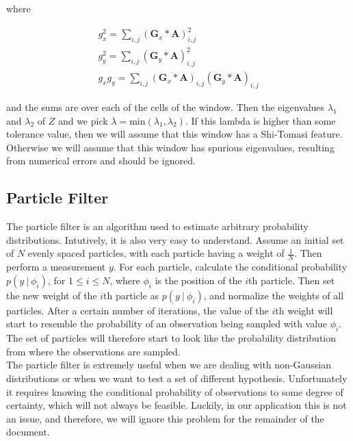 \documentclass{article}
\begin{document}
where

\begin{gather*}
g_x^2 = \sum_{i, j} (\mathbf{G}_x * \mathbf{A})_{i, j}^2 \\
g_y^2 = \sum_{i, j} (\mathbf{G}_y * \mathbf{A})_{i, j}^2 \\
g_x g_y = \sum_{i, j} (\mathbf{G}_x * \mathbf{A})_{i, j} (\mathbf{G}_y * \mathbf{A})_{i, j}
\end{gather*}

and the sums are over each of the cells of the window. Then the eigenvalues $\lambda_1$ and $\lambda_2$ of $Z$ and we pick $\lambda = \text{min} (\lambda_1, \lambda_2)$. If this lambda is higher than some tolerance value, then we will assume that this window has a Shi-Tomasi feature. Otherwise we will assume that this window has spurious eigenvalues, resulting from numerical errors and should be ignored. \\

\subsection{Particle Filter}

The particle filter \cite{Arulampalam2002} is an algorithm used to estimate arbitrary probability distributions. Intutively, it is also very easy to understand. Assume an initial set of $N$ evenly spaced particles, with each particle having a weight of $\frac{1}{N}$. Then perform a measurement $y$. For each particle, calculate the conditional probability $p(y \: | \: \phi_i)$, for $1 \leq i \leq N$, where $\phi_i$ is the position of the $i$th particle. Then set the new weight of the $i$th particle as $p(y \: | \: \phi_i)$, and normalize the weights of all particles. After a certain number of iterations, the value of the $i$th weight will start to resemble the probability of an observation being sampled with value $\phi_i$. The set of particles will therefore start to look like the probability distribution from where the observations are sampled. \\

The particle filter is extremely useful when we are dealing with non-Gaussian distributions or when we want to test a set of different hypothesis. Unfortunately it requires knowing the conditional probability of observations to some degree of certainty, which will not always be feasible. Luckily, in our application this is not an issue, and therefore, we will ignore this problem for the remainder of the document. \\
\end{document}
